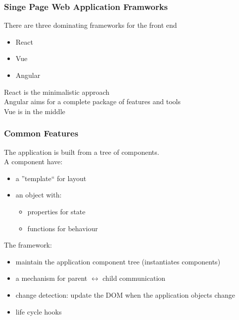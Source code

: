 \begin{frame}[fragile] \frametitle{Singe Page Web Application Framworks}
There are three dominating frameworks for the front end
\begin{itemize}
  \item React
  \item Vue
  \item Angular
\end{itemize}

React is the minimalistic approach
\\Angular aims for a complete package of features and tools
\\Vue is in the middle
\end{frame}

\begin{frame}[fragile] \frametitle{Common Features}

The application is built from a tree of components.
\\A component have:
\begin{itemize}
  \item a ''template`` for layout
  \item an object with:
  \begin{itemize} 
    \item properties for state
    \item functions for behaviour
  \end{itemize}
\end{itemize}

\vspace{5mm}
The framework:
\begin{itemize}
  \item maintain the application component tree (instantiates components)
  \item a mechanism for parent $\leftrightarrow$ child communication
  \item change detection: update the DOM when the application objects change
  \item life cycle hooks
\end{itemize}
\end{frame}

